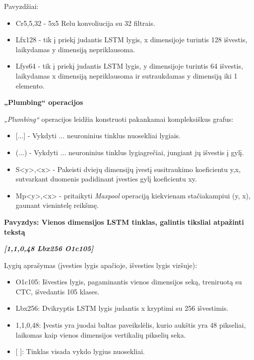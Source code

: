 \documentclass{VUMIFInfBakalaurinis}
\begin{document}
Pavyzdžiai:

\begin{itemize}[itemsep=0.5pt]
  \item Cr5,5,32 - 5x5 Relu konvoliucija su 32 filtrais.
  \item Lfx128 - tik į priekį judantis LSTM lygis, x dimensijoje turintis 128 išvestis, laikydamas y dimensiją nepriklausoma.
  \item Lfys64 - tik į priekį judantis LSTM lygis, y dimensijoje turintis 64 išvestis, laikydamas x dimensiją nepriklausoma ir sutraukdamas y dimensiją iki 1 elemento.
\end{itemize}

\textbf{„Plumbing“ operacijos}

\textit{„Plumbing“} operacijos leidžia konstruoti pakankamai kompleksiškus grafus:

\begin{itemize}[itemsep=0.5pt]
  \item {[...]} - Vykdyti ... neuroninius tinklus nuosekliai lygiais.
  \item (...) - Vykdyti ... neuroninius tinklus lygiagrečiai, jungiant jų išvestis į gylį.
  \item S<y>,<x> - Pakeisti dviejų dimensijų įvestį susitraukimo koeficientu y,x, sutvarkant duomenis padidinant įvesties gylį koeficientu xy.
  \item Mp<y>,<x> - pritaikyti \textit{Maxpool} operaciją kiekvienam stačiakampiui (y, x), gaunant vienintelę reikšmę.
\end{itemize}

\textbf{Pavyzdys: Vienos dimensijos LSTM tinklas, galintis tiksliai atpažinti tekstą}

\textbf{\textit{[1,1,0,48 Lbx256 O1c105]}}

Lygių aprašymas (įvesties lygis apačioje, išvesties lygis viršuje):

\begin{itemize}[itemsep=0.5pt]
  \item O1c105: Išvesties lygis, pagaminantis vienos dimensijos seką, treniruotą su CTC, išvedantis 105 klases.
  \item Lbx256: Dvikryptis LSTM lygis judantis x kryptimi su 256 išvestimis.
  \item 1,1,0,48: Įvestis yra juodai baltas paveikslėlis, kurio aukštis yra 48 pikseliai, laikomas kaip vienos dimensijos vertikalių pikselių seka.
  \item {[ ]}: Tinklas visada vykdo lygius nuosekliai.
\end{itemize}
\end{document}
